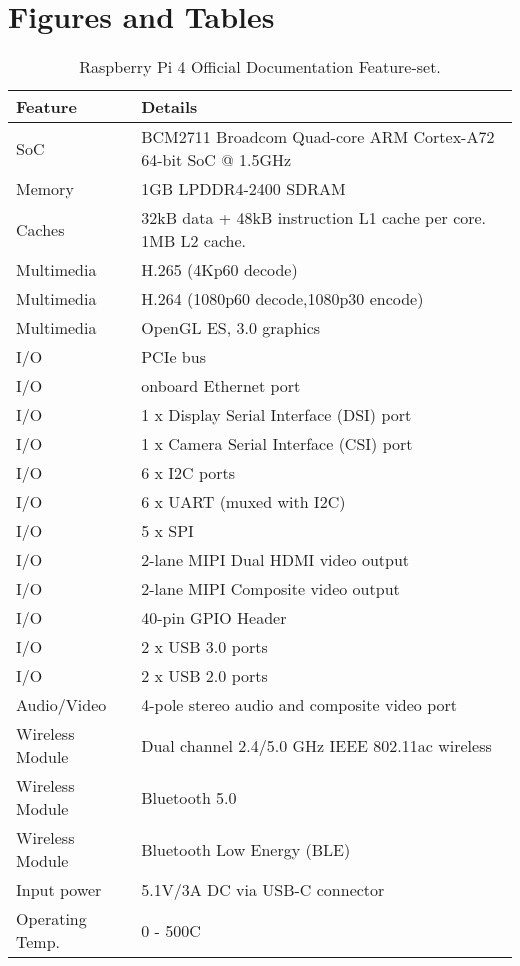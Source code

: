 \documentclass[journal]{IEEEtran}
\begin{document}
    \section{Figures and Tables}
    \begin{table}[h!] 
        \begin{center}
          \caption{Raspberry Pi 4 Official Documentation Feature-set.}
          \label{tab:table1}
          \begin{tabular}{l|l} %
            \textbf{Feature} & \textbf{Details}\\
            \hline
            SoC & BCM2711 Broadcom Quad-core ARM Cortex-A72 64-bit SoC @ 1.5GHz\\
            Memory & 1GB LPDDR4-2400 SDRAM \\
            Caches & 32kB data + 48kB instruction L1 cache per core. 1MB L2 cache.\\
            Multimedia & H.265 (4Kp60 decode)\\
            Multimedia & H.264 (1080p60 decode,1080p30 encode)\\
            Multimedia & OpenGL ES, 3.0 graphics\\
            I/O & PCIe bus\\
            I/O & onboard Ethernet port\\
            I/O & 1 x Display Serial Interface (DSI) port\\
            I/O & 1 x Camera Serial Interface (CSI) port\\
            I/O & 6 x I2C ports\\
            I/O & 6 x UART (muxed with I2C)\\
            I/O & 5 x SPI\\
            I/O & 2-lane MIPI Dual HDMI video output\\
            I/O & 2-lane MIPI Composite video output\\
            I/O & 40-pin GPIO Header\\
            I/O & 2 x USB 3.0 ports\\
            I/O & 2 x USB 2.0 ports\\
            Audio/Video & 4-pole stereo audio and composite video port\\
            Wireless Module & Dual channel 2.4/5.0 GHz IEEE 802.11ac wireless\\
            Wireless Module & Bluetooth 5.0\\
            Wireless Module & Bluetooth Low Energy (BLE)\\
            Input power & 5.1V/3A DC via USB-C connector\\
            Operating Temp. & 0 - 500C
          \end{tabular}
        \end{center}
      \end{table}
\end{document}
